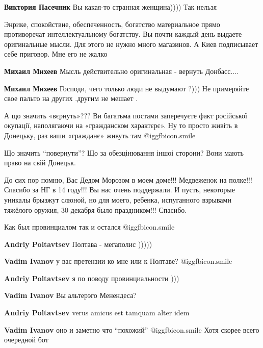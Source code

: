 \begin{itemize}
\textbf{Виктория Пасечник} Вы какая-то странная женщина)))) Так нельзя


Энрике, спокойствие, обеспеченность, богатство материальное прямо противоречат
интеллектуальному богатству. Вы почти каждый день выдаете оригинальные мысли.
Для этого не нужно много магазинов. А Киев подписывает себе приговор. Мне его
не жалко

\begin{itemize} %
\textbf{Михаил Михеев}
Мысль действительно оригинальная - вернуть Донбасс....

\textbf{Михаил Михеев} Господи, чего только люди не выдумают ?))) Не примеряйте свое пальто на других .другим не мешает .
\end{itemize} %

А що значить «вєрнуть»???
Ви багатьма постами заперечуєте факт російської окупації, наполягаючи на «гражданском характєрє».
Ну то просто живіть в Донецьку, раз ваши «гражданє» живуть там  @igg{fbicon.smile} 

Що значить \enquote{повернути}? Що за обезцінювання іншоі сторони? Вони мають право на свій Донецьк.


До сих пор помню, Вас Дедом Морозом в моем доме!!! Медвеженок на полке!!!
Спасибо за НГ в 14 году!!! Вы нас очень поддержали. И пусть, некоторые уникалы
брызжут слюной, но для моего, ребенка, испуганного взрывами тяжёлого оружия,
30 декабря было праздником!!! Спасибо.

Как был провинциалом так и остался  @igg{fbicon.smile} 

\begin{itemize} %
\textbf{Andriy Poltavtsev} Полтава - мегаполис )))))

\textbf{Vadim Ivanov} у вас претензии ко мне или к Полтаве?  @igg{fbicon.smile} 

\textbf{Andriy Poltavtsev} я по поводу провинциальности )))

\textbf{Vadim Ivanov} Вы альтерэго Менендеса?

\textbf{Andriy Poltavtsev} verus amicus est tamquam alter idem

\textbf{Vadim Ivanov} оно и заметно что \enquote{похожий}  @igg{fbicon.smile}  Хотя скорее всего очередной бот


\end{itemize}
\end{itemize}
